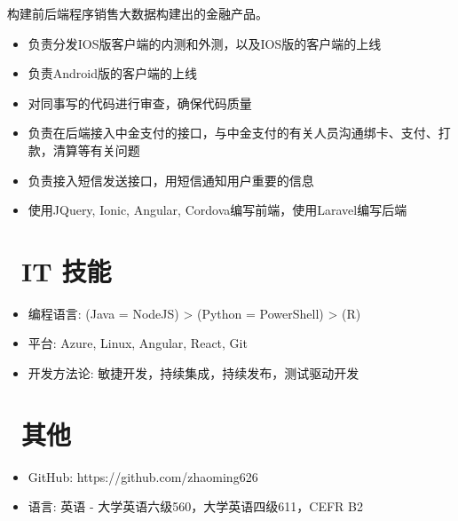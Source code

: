 \documentclass{resume}
\begin{document}
构建前后端程序销售大数据构建出的金融产品。
\begin{itemize}
  \item 负责分发IOS版客户端的内测和外测，以及IOS版的客户端的上线
  \item 负责Android版的客户端的上线
  \item 对同事写的代码进行审查，确保代码质量
  \item 负责在后端接入中金支付的接口，与中金支付的有关人员沟通绑卡、支付、打款，清算等有关问题
  \item 负责接入短信发送接口，用短信通知用户重要的信息
  \item 使用JQuery, Ionic, Angular, Cordova编写前端，使用Laravel编写后端
\end{itemize}

\section{\faCogs\ IT 技能}
\begin{itemize}[parsep=0.5ex]
  \item 编程语言: (Java = NodeJS) > (Python = PowerShell) > (R)
  \item 平台: Azure, Linux, Angular, React, Git
  \item 开发方法论: 敏捷开发，持续集成，持续发布，测试驱动开发
\end{itemize}

\section{\faInfo\ 其他}
\begin{itemize}[parsep=0.5ex]
  \item GitHub: https://github.com/zhaoming626
  \item 语言: 英语 - 大学英语六级560，大学英语四级611，CEFR B2
\end{itemize}

%
%
\end{document}
